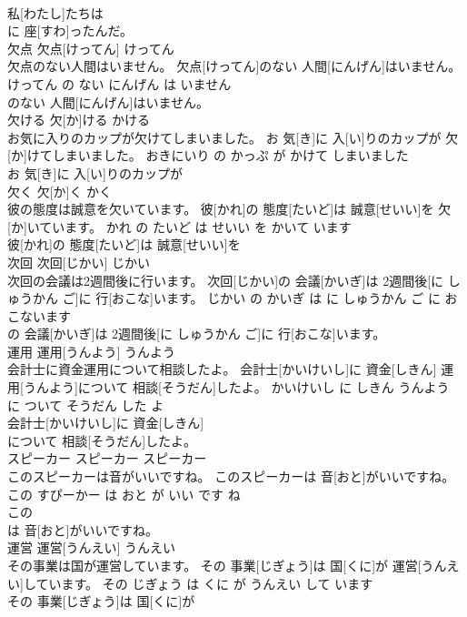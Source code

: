 \documentclass[8pt]{extreport}
\begin{document}
\begin{CJK}{UTF8}{min}
\\	私[わたし]たちは
\\	に 座[すわ]ったんだ。			
\\	欠点	欠点[けってん]	けってん	
\\	欠点のない人間はいません。	欠点[けってん]のない 人間[にんげん]はいません。	けってん の ない にんげん は いません	
\\	のない 人間[にんげん]はいません。			
\\	欠ける	欠[か]ける	かける	
\\	お気に入りのカップが欠けてしまいました。	お 気[き]に 入[い]りのカップが 欠[か]けてしまいました。	おきにいり の かっぷ が かけて しまいました	
\\	お 気[き]に 入[い]りのカップが
\\	欠く	欠[か]く	かく	
\\	彼の態度は誠意を欠いています。	彼[かれ]の 態度[たいど]は 誠意[せいい]を 欠[か]いています。	かれ の たいど は せいい を かいて います	
\\	彼[かれ]の 態度[たいど]は 誠意[せいい]を
\\	次回	次回[じかい]	じかい	
\\	次回の会議は2週間後に行います。	次回[じかい]の 会議[かいぎ]は 2週間後[に しゅうかん ご]に 行[おこな]います。	じかい の かいぎ は に しゅうかん ご に おこないます	
\\	の 会議[かいぎ]は 2週間後[に しゅうかん ご]に 行[おこな]います。			
\\	運用	運用[うんよう]	うんよう	
\\	会計士に資金運用について相談したよ。	会計士[かいけいし]に 資金[しきん] 運用[うんよう]について 相談[そうだん]したよ。	かいけいし に しきん うんよう に ついて そうだん した よ	
\\	会計士[かいけいし]に 資金[しきん]
\\	について 相談[そうだん]したよ。			
\\	スピーカー	スピーカー	スピーカー	
\\	このスピーカーは音がいいですね。	このスピーカーは 音[おと]がいいですね。	この すぴーかー は おと が いい です ね	
\\	この
\\	は 音[おと]がいいですね。			
\\	運営	運営[うんえい]	うんえい	
\\	その事業は国が運営しています。	その 事業[じぎょう]は 国[くに]が 運営[うんえい]しています。	その じぎょう は くに が うんえい して います	
\\	その 事業[じぎょう]は 国[くに]が

\end{CJK}
\end{document}
